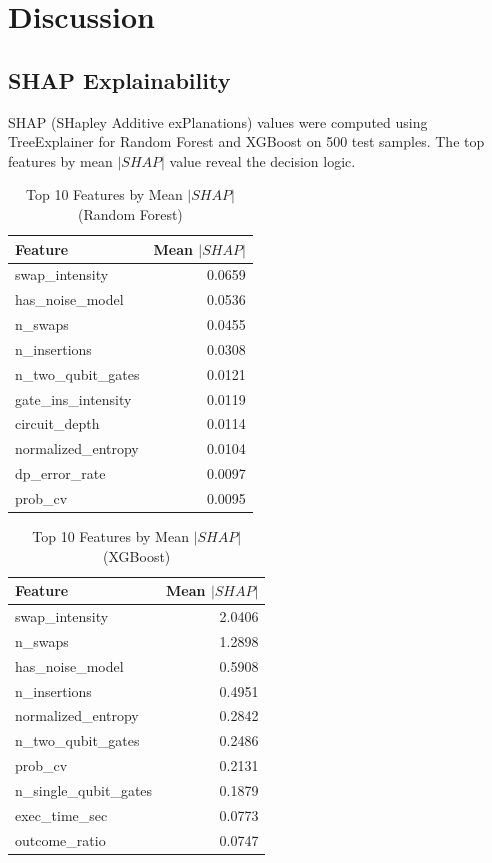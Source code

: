 \section{Discussion}
\label{sec:discussion}

\subsection{SHAP Explainability}

SHAP (SHapley Additive exPlanations) values were computed using TreeExplainer for Random Forest and XGBoost on 500 test samples. The top features by mean $|SHAP|$ value reveal the decision logic.

\begin{table}[H]
\centering
\caption{Top 10 Features by Mean $|SHAP|$ (Random Forest)}
\label{tab:shap_rf}
\begin{tabular}{lr}
\toprule
\textbf{Feature} & \textbf{Mean $|SHAP|$} \\
\midrule
swap\_intensity & 0.0659 \\
has\_noise\_model & 0.0536 \\
n\_swaps & 0.0455 \\
n\_insertions & 0.0308 \\
n\_two\_qubit\_gates & 0.0121 \\
gate\_ins\_intensity & 0.0119 \\
circuit\_depth & 0.0114 \\
normalized\_entropy & 0.0104 \\
dp\_error\_rate & 0.0097 \\
prob\_cv & 0.0095 \\
\bottomrule
\end{tabular}
\end{table}

\begin{table}[H]
\centering
\caption{Top 10 Features by Mean $|SHAP|$ (XGBoost)}
\label{tab:shap_xgb}
\begin{tabular}{lr}
\toprule
\textbf{Feature} & \textbf{Mean $|SHAP|$} \\
\midrule
swap\_intensity & 2.0406 \\
n\_swaps & 1.2898 \\
has\_noise\_model & 0.5908 \\
n\_insertions & 0.4951 \\
normalized\_entropy & 0.2842 \\
n\_two\_qubit\_gates & 0.2486 \\
prob\_cv & 0.2131 \\
n\_single\_qubit\_gates & 0.1879 \\
exec\_time\_sec & 0.0773 \\
outcome\_ratio & 0.0747 \\
\bottomrule
\end{tabular}
\end{table}

